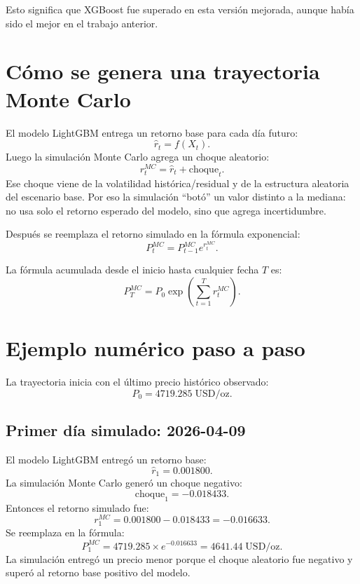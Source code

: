 \documentclass[12pt,letterpaper]{article}
\begin{document}
Esto significa que XGBoost fue superado en esta versión mejorada, aunque había sido el mejor en el trabajo anterior.

\section{Cómo se genera una trayectoria Monte Carlo}
El modelo LightGBM entrega un retorno base para cada día futuro:
\begin{equation}
\hat{r}_t=f(X_t).
\end{equation}
Luego la simulación Monte Carlo agrega un choque aleatorio:
\begin{equation}
r_t^{MC}=\hat{r}_t+\text{choque}_t.
\end{equation}
Ese choque viene de la volatilidad histórica/residual y de la estructura aleatoria del escenario base. Por eso la simulación ``botó'' un valor distinto a la mediana: no usa solo el retorno esperado del modelo, sino que agrega incertidumbre.

Después se reemplaza el retorno simulado en la fórmula exponencial:
\begin{equation}
P_t^{MC}=P_{t-1}^{MC}e^{r_t^{MC}}.
\end{equation}

La fórmula acumulada desde el inicio hasta cualquier fecha $T$ es:
\begin{equation}
P_T^{MC}=P_0\exp\left(\sum_{t=1}^{T}r_t^{MC}\right).
\end{equation}

\section{Ejemplo numérico paso a paso}
La trayectoria inicia con el último precio histórico observado:
\begin{equation}
P_0=4719.285\;\text{USD/oz}.
\end{equation}

\subsection{Primer día simulado: 2026-04-09}
El modelo LightGBM entregó un retorno base:
\begin{equation}
\hat{r}_1=0.001800.
\end{equation}
La simulación Monte Carlo generó un choque negativo:
\begin{equation}
\text{choque}_1=-0.018433.
\end{equation}
Entonces el retorno simulado fue:
\begin{equation}
r_1^{MC}=0.001800-0.018433=-0.016633.
\end{equation}
Se reemplaza en la fórmula:
\begin{equation}
P_1^{MC}=4719.285\times e^{-0.016633}=4641.44\;\text{USD/oz}.
\end{equation}
La simulación entregó un precio menor porque el choque aleatorio fue negativo y superó al retorno base positivo del modelo.
\end{document}
